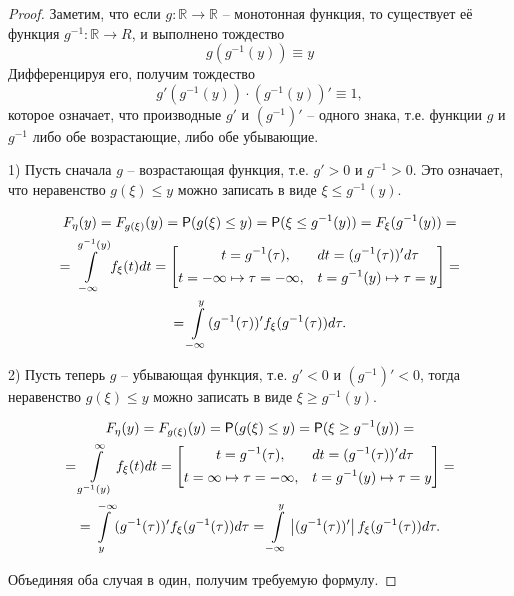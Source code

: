 \begin{proof}
Заметим, что если $g :\mathbb{R} \to \mathbb{R}$  -- монотонная функция, то существует её функция $g^{-1} :\mathbb{R} \to R$, и выполнено тождество
\begin{equation*}
	g(g^{-1}(y))\equiv y 	
\end{equation*} 
Дифференцируя его, получим тождество
\begin{equation*}
	g'(g^{-1}(y)) \cdot (g^{-1} (y))' \equiv 1,
\end{equation*}
которое означает, что производные $g′$ и $(g^{-1})'$ --
одного знака, т.е. функции $g$ и $g^{-1}$ либо обе возрастающие, либо обе убывающие.


1) Пусть сначала $g$ -- возрастающая функция, т.е. $g' > 0$ и $g^{-1} > 0$. Это означает, что неравенство $g(\xi) \leq y$ можно записать в виде $ \xi \leq g^{-1}(y)$.

\begin{gather*}
	F_{\eta}(y) = F_{g(\xi)}(y) = \P(g(\xi) \leq y) = \P(\xi \leq g^{-1} (y)) = F_\xi (g^{-1} (y)) =\\=
	\int\limits^{g^{-1}(y)}_{-\infty} f_\xi(t) dt=
	\left[
	\begin{aligned}
		t = g^{-1} (\tau ),\qquad & dt = (g^{-1}(\tau ))' d\tau\\
		t = -\infty \mapsto \tau = -\infty,\quad & t = g^{-1}(y) \mapsto \tau = y
	\end{aligned}\right]=\\=
	\int\limits_{-\infty}^y (g^{-1}(\tau))' f_\xi(g^{-1}(\tau)) d\tau.
\end{gather*}



2) Пусть теперь $g$ -- убывающая функция, т.е. $g'< 0 $ и $(g^{-1})' < 0$, тогда
неравенство $g(\xi) \leq y$ можно записать в виде $\xi \geq g^{-1} (y)$.

\begin{gather*}
	F_{\eta}(y) = F_{g(\xi)}(y) = \P(g(\xi) \leq y) = \P(\xi \geq g^{-1} (y)) =\\=
	\int\limits_{g^{-1}(y)}^{\infty} f_\xi(t) dt=
	\left[
	\begin{aligned}
		t = g^{-1} (\tau ),\qquad & dt = (g^{-1}(\tau ))' d\tau\\
		t = \infty \mapsto \tau = -\infty,\quad & t = g^{-1}(y) \mapsto \tau = y
	\end{aligned}\right]=\\=\int\limits^{-\infty}_y (g^{-1}(\tau))' f_\xi(g^{-1}(\tau)) d\tau=
	\int\limits_{-\infty}^y \left|(g^{-1}(\tau))'\right| f_\xi(g^{-1}(\tau)) d\tau.
\end{gather*}

Объединяя оба случая в один, получим требуемую формулу.
\end{proof}

